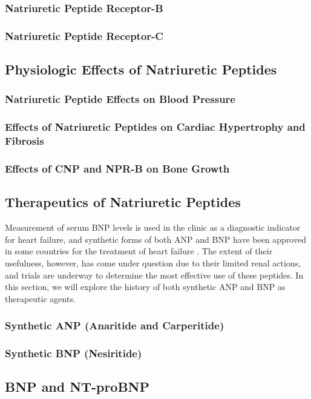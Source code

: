 {{{{{{{{{\subsubsection{Natriuretic Peptide Receptor-B}
\subsubsection{Natriuretic Peptide Receptor-C}
\subsection{Physiologic Effects of Natriuretic Peptides}
\subsubsection{Natriuretic Peptide Effects on Blood Pressure}
\subsubsection{Effects of Natriuretic Peptides on Cardiac Hypertrophy and Fibrosis}
\subsubsection{Effects of CNP and NPR-B on Bone Growth}
\subsection{Therapeutics of Natriuretic Peptides}
Measurement of serum BNP levels is used in the clinic as a diagnostic indicator for heart failure, and synthetic forms of both ANP and BNP have been approved in some countries for the treatment of heart failure \citep{Gardner2003a}. The extent of their usefulness, however, has come under question due to their limited renal actions, and trials are underway to determine the most effective use of these peptides. In this section, we will explore the history of both synthetic ANP and BNP as therapeutic agents. %
\subsubsection{Synthetic ANP (Anaritide and Carperitide)}
\subsubsection{Synthetic BNP (Nesiritide)}
\subsection{BNP and NT-proBNP}
}}}}}}}}}
